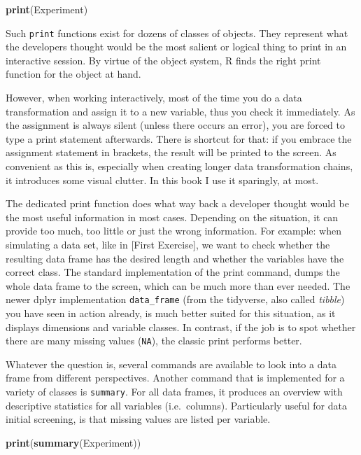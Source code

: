 \documentclass[]{svmono}
\newenvironment{Shaded}{\begin{snugshade}}{\end{snugshade}}
\newcommand{\KeywordTok}[1]{\textcolor[rgb]{0.13,0.29,0.53}{\textbf{#1}}}
\newcommand{\NormalTok}[1]{#1}
\theoremstyle{definition}
\theoremstyle{definition}
\theoremstyle{definition}
\theoremstyle{remark}
\begin{document}
\begin{Shaded}
\begin{Highlighting}[]
\KeywordTok{print}\NormalTok{(Experiment)}
\end{Highlighting}
\end{Shaded}

Such \texttt{print} functions exist for dozens of classes of objects.
They represent what the developers thought would be the most salient or
logical thing to print in an interactive session. By virtue of the
object system, R finds the right print function for the object at hand.

However, when working interactively, most of the time you do a data
transformation and assign it to a new variable, thus you check it
immediately. As the assignment is always silent (unless there occurs an
error), you are forced to type a print statement afterwards. There is
shortcut for that: if you embrace the assignment statement in brackets,
the result will be printed to the screen. As convenient as this is,
especially when creating longer data transformation chains, it
introduces some visual clutter. In this book I use it sparingly, at
most.

The dedicated print function does what way back a developer thought
would be the most useful information in most cases. Depending on the
situation, it can provide too much, too little or just the wrong
information. For example: when simulating a data set, like in {[}First
Exercise{]}, we want to check whether the resulting data frame has the
desired length and whether the variables have the correct class. The
standard implementation of the print command, dumps the whole data frame
to the screen, which can be much more than ever needed. The newer dplyr
implementation \texttt{data\_frame} (from the tidyverse, also called
\emph{tibble}) you have seen in action already, is much better suited
for this situation, as it displays dimensions and variable classes. In
contrast, if the job is to spot whether there are many missing values
(\texttt{NA}), the classic print performs better.

Whatever the question is, several commands are available to look into a
data frame from different perspectives. Another command that is
implemented for a variety of classes is \texttt{summary}. For all data
frames, it produces an overview with descriptive statistics for all
variables (i.e.~columns). Particularly useful for data initial
screening, is that missing values are listed per variable.

\begin{Shaded}
\begin{Highlighting}[]
\KeywordTok{print}\NormalTok{(}\KeywordTok{summary}\NormalTok{(Experiment))}
\end{Highlighting}
\end{Shaded}
\end{document}
